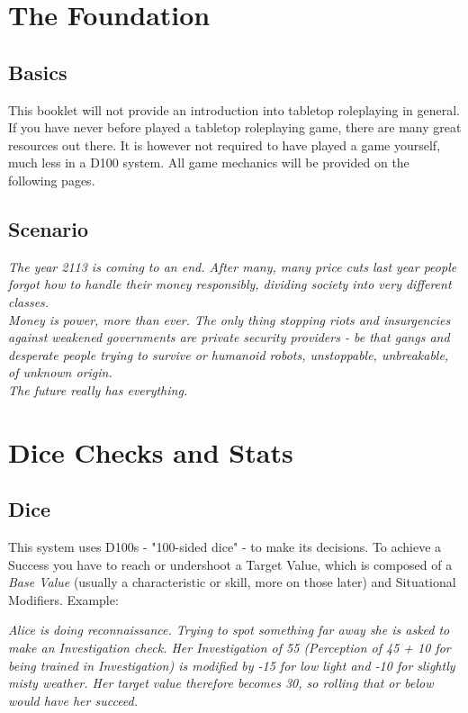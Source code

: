 \documentclass[12pt,a4paper,openany,usenames,dvipsnames]{book}
\begin{document}
	

	\chapter{The Foundation}
	\section{Basics}
	This booklet will not provide an introduction into tabletop roleplaying in general. If you have never before played a tabletop roleplaying game, there are many great resources out there. It is however not required to have played a game yourself, much less in a D100 system. All game mechanics will be provided on the following pages.
	\section{Scenario}
	\begin{exampleblock}
		\vspace{8mm}\itshape
		The year 2113 is coming to an end. After many, many price cuts last year people forgot how to handle their money responsibly, dividing society into \emph{very} different classes. \\
		Money is power, more than ever. The only thing stopping riots and insurgencies against weakened governments are private security providers - be that gangs and desperate people trying to survive or humanoid robots, unstoppable, unbreakable, of unknown origin. \\
		The future really has everything.
	\end{exampleblock}

	\chapter{Dice Checks and Stats}
	\section{Dice}
	This system uses D100s - "100-sided dice" - to make its decisions. To achieve a Success you have to reach or undershoot a Target Value, which is composed of a \emph{Base Value} (usually a characteristic or skill, more on those later) and Situational Modifiers. Example:

	\begin{exampleblock}
		\itshape
		Alice is doing reconnaissance. Trying to spot something far away she is asked to make an Investigation check.
		Her Investigation of 55 (Perception of 45 + 10 for being trained in Investigation) is modified by -15 for low light and -10 for slightly misty weather. Her target value therefore becomes 30, so rolling that or below would have her succeed.
	\end{exampleblock}
\end{document}
